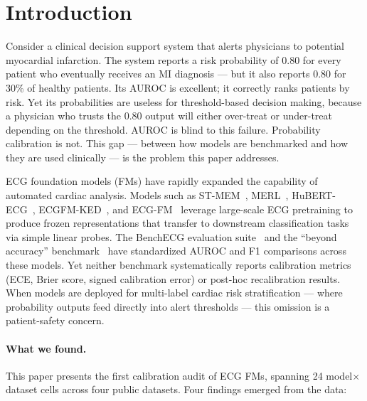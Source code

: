 \section{Introduction}
\label{sec:introduction}

Consider a clinical decision support system that alerts physicians to potential myocardial
infarction. The system reports a risk probability of 0.80 for every patient who eventually
receives an MI diagnosis --- but it also reports 0.80 for 30\% of healthy patients. Its AUROC
is excellent; it correctly ranks patients by risk. Yet its probabilities are useless for
threshold-based decision making, because a physician who trusts the 0.80 output will either
over-treat or under-treat depending on the threshold. AUROC is blind to this failure.
Probability calibration is not. This gap --- between how models are benchmarked and how they
are used clinically --- is the problem this paper addresses.

ECG foundation models (FMs) have rapidly expanded the capability of automated cardiac
analysis. Models such as ST-MEM~\citep{na2024stmem}, MERL~\citep{liu2024merl},
HuBERT-ECG~\citep{hubertecg2024}, ECGFM-KED~\citep{ecgfmked2024}, and
ECG-FM~\citep{mckeen2024ecgfm} leverage large-scale ECG pretraining to produce frozen
representations that transfer to downstream classification tasks via simple linear probes.
The BenchECG evaluation suite~\citep{lunelli2025benchecg} and the ``beyond accuracy''
benchmark~\citep{filice2026beyond} have standardized AUROC and F1 comparisons across
these models. Yet neither benchmark systematically reports calibration metrics (ECE, Brier
score, signed calibration error) or post-hoc recalibration results. When models are
deployed for multi-label cardiac risk stratification --- where probability outputs feed
directly into alert thresholds --- this omission is a patient-safety concern.

\paragraph{What we found.}
This paper presents the first calibration audit of ECG FMs, spanning 24 model$\times$dataset
cells across four public datasets. Four findings emerged from the data:

